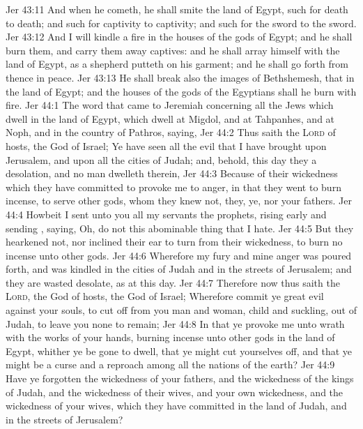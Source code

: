 \vs Jer 43:11 And when he cometh, he shall smite the land of Egypt,  such  for death to death; and such  for captivity to captivity; and such  for the sword to the sword.
\vs Jer 43:12 And I will kindle a fire in the houses of the gods of Egypt; and he shall burn them, and carry them away captives: and he shall array himself with the land of Egypt, as a shepherd putteth on his garment; and he shall go forth from thence in peace.
\vs Jer 43:13 He shall break also the images of Bethshemesh, that  in the land of Egypt; and the houses of the gods of the Egyptians shall he burn with fire.
\vs Jer 44:1 The word that came to Jeremiah concerning all the Jews which dwell in the land of Egypt, which dwell at Migdol, and at Tahpanhes, and at Noph, and in the country of Pathros, saying,
\vs Jer 44:2 Thus saith the \textsc{Lord} of hosts, the God of Israel; Ye have seen all the evil that I have brought upon Jerusalem, and upon all the cities of Judah; and, behold, this day they  a desolation, and no man dwelleth therein,
\vs Jer 44:3 Because of their wickedness which they have committed to provoke me to anger, in that they went to burn incense,  to serve other gods, whom they knew not,  they, ye, nor your fathers.
\vs Jer 44:4 Howbeit I sent unto you all my servants the prophets, rising early and sending , saying, Oh, do not this abominable thing that I hate.
\vs Jer 44:5 But they hearkened not, nor inclined their ear to turn from their wickedness, to burn no incense unto other gods.
\vs Jer 44:6 Wherefore my fury and mine anger was poured forth, and was kindled in the cities of Judah and in the streets of Jerusalem; and they are wasted  desolate, as at this day.
\vs Jer 44:7 Therefore now thus saith the \textsc{Lord}, the God of hosts, the God of Israel; Wherefore commit ye  great evil against your souls, to cut off from you man and woman, child and suckling, out of Judah, to leave you none to remain;
\vs Jer 44:8 In that ye provoke me unto wrath with the works of your hands, burning incense unto other gods in the land of Egypt, whither ye be gone to dwell, that ye might cut yourselves off, and that ye might be a curse and a reproach among all the nations of the earth?
\vs Jer 44:9 Have ye forgotten the wickedness of your fathers, and the wickedness of the kings of Judah, and the wickedness of their wives, and your own wickedness, and the wickedness of your wives, which they have committed in the land of Judah, and in the streets of Jerusalem?
